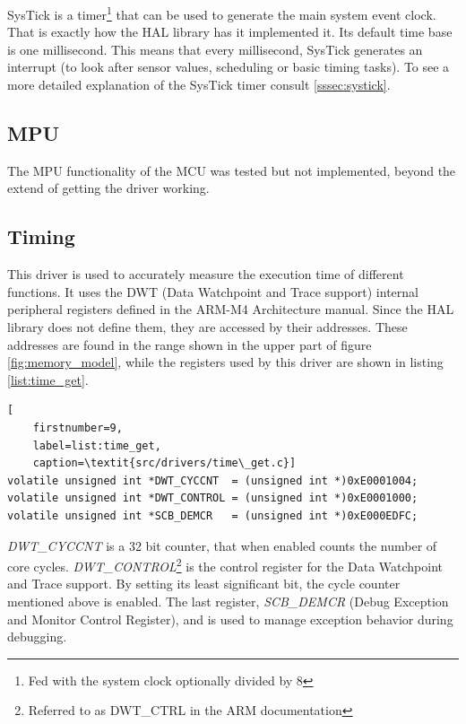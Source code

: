 SysTick is a timer\footnote{Fed with the system clock optionally
divided by 8} that can
be used to generate the main system event clock.
That is exactly how the HAL library has it implemented it.
Its default time base is one millisecond. This means that every millisecond,
SysTick generates an interrupt (to look after sensor values, scheduling or
basic timing tasks). To see a more detailed explanation of the SysTick
timer consult \ref{sssec:systick}.


\subsection{MPU}
The MPU functionality of the MCU was tested but not implemented,
beyond the extend of getting the driver working.


\subsection{Timing}
\label{ssec:timing}
This driver is used to accurately measure the execution time of different
functions. It uses the DWT (Data Watchpoint and Trace support)
internal peripheral registers defined in the ARM-M4 Architecture
manual\cite{arm_architecture}.
Since the HAL library does not define them, they are accessed by their addresses.
These addresses are found in the range shown in the upper part of
figure \ref{fig:memory_model}, while the registers used by this driver are
shown in listing \ref{list:time_get}.

\begin{minipage}{\linewidth}
\begin{lstlisting}[
	firstnumber=9,
	label=list:time_get,
	caption=\textit{src/drivers/time\_get.c}]
volatile unsigned int *DWT_CYCCNT  = (unsigned int *)0xE0001004;
volatile unsigned int *DWT_CONTROL = (unsigned int *)0xE0001000;
volatile unsigned int *SCB_DEMCR   = (unsigned int *)0xE000EDFC;
\end{lstlisting}
\end{minipage}

\textit{DWT\_CYCCNT} is a 32 bit counter, that when enabled counts
the number of core cycles. \textit{DWT\_CONTROL}\footnote{Referred to
as DWT\_CTRL in the ARM documentation} is the control register for the
Data Watchpoint and Trace support. By setting its least significant bit,
the cycle counter mentioned above is enabled. The last register,
\textit{SCB\_DEMCR} (Debug Exception and Monitor Control Register),
and is used to manage exception behavior during debugging.\\

